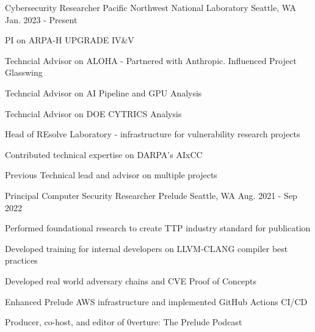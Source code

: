 

\begin{cventries}

  \cventry
    {Cybersecurity Researcher} %
    {Pacific Northwest National Laboratory} %
    {Seattle, WA} %
    {Jan. 2023 - Present} %
   {
      \begin{cvitems} %
        \item {PI on ARPA-H UPGRADE IV\&V}
        \item {Techncial Advisor on ALOHA - Partnered with Anthropic. Influenced Project Glasswing}
        \item {Techncial Advisor on AI Pipeline and GPU Analysis}
        \item {Techncial Advisor on DOE CYTRICS Analysis}
        \item {Head of REsolve Laboratory - infrastructure for vulnerability research projects}
        \item {Contributed technical expertise on DARPA's AIxCC}
        \item {Previous Technical lead and advisor on multiple projects}
      \end{cvitems}
    }

\vspace{1em}
  \cventry
    {Principal Computer Security Researcher} %
    {Prelude} %
    {Seattle, WA} %
    {Aug. 2021 - Sep 2022} %
   {
      \begin{cvitems} %
        \item {Performed foundational research to create TTP industry standard for publication}
        \item {Developed training for internal developers on LLVM-CLANG compiler best practices}
        \item {Developed real world adversary chains and CVE Proof of Concepts}
        \item {Enhanced Prelude AWS infrastructure and implemented GitHub Actions CI/CD}
        \item {Producer, co-host, and editor of 0verture: The Prelude Podcast}
      \end{cvitems}
    }


\end{cventries}
